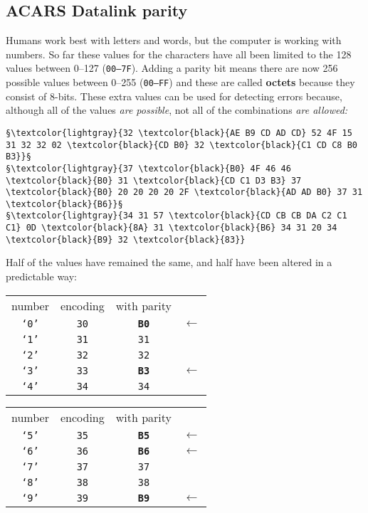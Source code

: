 \documentclass[tikz,a4paper,12pt]{article}
\begin{document}
\subsection{ACARS Datalink parity}

Humans work best with letters and words, but the computer is working
with numbers.  So far these values for the characters have all been
limited to the 128 values between 0--127 (\texttt{00--7F}). Adding a
parity bit means there are now 256 possible values between 0--255
(\texttt{00--FF}) and these are called \textbf{octets} because they consist of 8-bits.  These extra values can be used for detecting
errors because, although all of the values \emph{are possible}, not all of the combinations \emph{are allowed:}

\begin{lstlisting}[language=ACARS]
         §\textcolor{lightgray}{32 \textcolor{black}{AE B9 CD AD CD} 52 4F 15 31 32 32 02 \textcolor{black}{CD B0} 32 \textcolor{black}{C1 CD C8 B0 B3}}§
§\textcolor{lightgray}{37 \textcolor{black}{B0} 4F 46 46 \textcolor{black}{B0} 31 \textcolor{black}{CD C1 D3 B3} 37 \textcolor{black}{B0} 20 20 20 20 2F \textcolor{black}{AD AD B0} 37 31 \textcolor{black}{B6}}§
§\textcolor{lightgray}{34 31 57 \textcolor{black}{CD CB CB DA C2 C1 C1} 0D \textcolor{black}{8A} 31 \textcolor{black}{B6} 34 31 20 34 \textcolor{black}{B9} 32 \textcolor{black}{83}}
\end{lstlisting}


Half of the values have remained the same, and half have been altered in a predictable way:

\begin{center}
\begin{tabular}{c|c|cl}
number & encoding & with parity &\\[0.5em]
\texttt{`0'} & \texttt{30} & \textbf{\texttt{B0}}&$\leftarrow$\\
\texttt{`1'} & \texttt{31} & \texttt{31}&\\
\texttt{`2'} & \texttt{32} & \texttt{32}&\\
\texttt{`3'} & \texttt{33} & \textbf{\texttt{B3}}&$\leftarrow$\\
\texttt{`4'} & \texttt{34} & \texttt{34}&\\
\end{tabular}
\quad\quad
\begin{tabular}{c|c|cl}
number & encoding & with parity &\\[0.5em]
\texttt{`5'} & \texttt{35} & \textbf{\texttt{B5}}&$\leftarrow$\\
\texttt{`6'} & \texttt{36} & \textbf{\texttt{B6}}&$\leftarrow$\\
\texttt{`7'} & \texttt{37} & \texttt{37}&\\
\texttt{`8'} & \texttt{38} & \texttt{38}&\\
\texttt{`9'} & \texttt{39} & \textbf{\texttt{B9}}&$\leftarrow$\\
\end{tabular}
\end{center}
\end{document}

